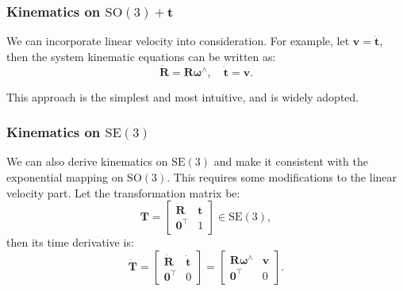 \subsubsection{Kinematics on $\mathrm{SO}(3) + \mathbf{t}$}

We can incorporate linear velocity into consideration. For example, let $\mathbf{v} = \dot{\mathbf{t}}$, then the system kinematic equations can be written as:
\begin{equation}\label{key}
	\dot{\mathbf{R}} = \mathbf{R} \boldsymbol{\omega}^\wedge, \quad \dot{\mathbf{t}} = \mathbf{v}.
\end{equation}

This approach is the simplest and most intuitive, and is widely adopted.

\subsubsection{Kinematics on $\mathrm{SE}(3)$}

We can also derive kinematics on $\mathrm{SE}(3)$ and make it consistent with the exponential mapping on $\mathrm{SO}(3)$. This requires some modifications to the linear velocity part. Let the transformation matrix be:
\begin{equation}\label{key}
	\mathbf{T} = \begin{bmatrix}
		\mathbf{R} & \mathbf{t} \\
		\mathbf{0}^\top & 1
	\end{bmatrix} \in \mathrm{SE}(3),
\end{equation}
then its time derivative is:
\begin{equation}\label{key}
	\dot{\mathbf{T}} = \begin{bmatrix}
		\dot{\mathbf{R}} & \dot{\mathbf{t}} \\
		\mathbf{0}^\top & 0
	\end{bmatrix}
	= \begin{bmatrix}
		\mathbf{R} \boldsymbol{\omega}^\wedge & \mathbf{v} \\
		\mathbf{0} ^\top & 0
	\end{bmatrix}.
\end{equation}


